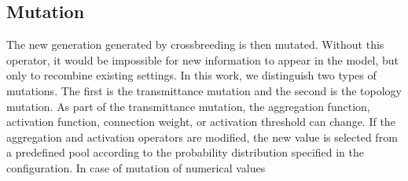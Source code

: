 \FloatBarrier
\subsection{Mutation}
The new generation generated by crossbreeding is then mutated. Without this operator, 
it would be impossible for new information to appear in the model, 
but only to recombine existing settings.
In this work, we distinguish two types of mutations. The first is the transmittance mutation 
and the second is the topology mutation. 
As part of the transmittance mutation, the aggregation function, activation function, 
connection weight, or activation threshold can change.
If the aggregation and activation operators are modified, the new value is selected from a 
predefined pool according to the probability distribution specified in the configuration.
In case of mutation of numerical values
